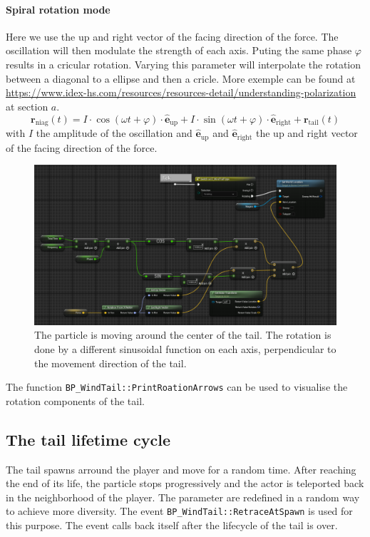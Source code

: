 \documentclass[../main.tex]{subfile}
\begin{document}
    \paragraph{Spiral rotation mode}
    Here we use the up and right vector of the facing direction of the force. The oscillation will then modulate the strength of each axis. Puting the same phase $\varphi$ results
    in a cricular rotation. Varying this parameter will interpolate the rotation between a diagonal to a ellipse and then a cricle. More exemple can be found at \url{https://www.idex-hs.com/resources/resources-detail/understanding-polarization} 
    at section $a.$
    \[
        \bm{r}_{\text{niag}}(t) = I\cdot \cos(\omega t + \varphi) \cdot \hat{\bm{e}}_{\text{up}} + I\cdot \sin(\omega t + \varphi) \cdot \hat{\bm{e}}_{\text{right}}+ \bm{r}_{\text{tail}}(t) 
    \]
    with $I$ the amplitude of the oscillation and $\hat{\bm{e}}_{\text{up}}$ and $\hat{\bm{e}}_{\text{right}}$ the up and right vector of the facing direction of the force.
    \begin{figure}[H]
        \centering
        \includegraphics[width=1\textwidth]{Ressources/TailRotation.png}
        \caption{The particle is moving around the center of the tail. The rotation is done by a different sinusoidal function on each axis, perpendicular to the movement direction of
        the tail.}
    \end{figure}
    The function \texttt{BP\_WindTail::PrintRoationArrows} can be used to visualise the rotation components of the tail.  

    \subsection{The tail lifetime cycle}
    The tail spawns arround the player and move for a random time. After reaching the end of its life, the particle stops progressively and the actor is 
    teleported back in the neighborhood of the player. The parameter are redefined in a random way to achieve more diversity. The event \texttt{BP\_WindTail::RetraceAtSpawn}
    is used for this purpose. The event calls back itself after the lifecycle of the tail is over. 
\end{document}
